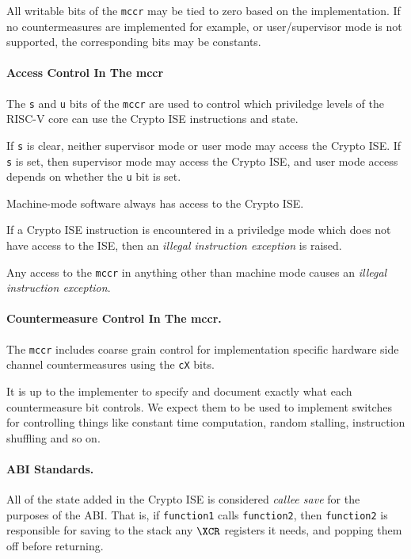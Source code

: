 All writable bits of the {\tt mccr} may be tied to zero based on the
implementation. If no countermeasures are implemented for example, or
user/supervisor mode is not supported, the corresponding bits may be
constants.

\paragraph{Access Control In The mccr}

The {\tt s} and {\tt u} bits of the {\tt mccr} are used to control which
priviledge levels of the RISC-V core can use the Crypto ISE instructions
and state. 

If {\tt s} is clear, neither supervisor mode or user mode may access the
Crypto ISE. If {\tt s} is set, then supervisor mode may access the Crypto
ISE, and user mode access depends on whether the {\tt u} bit is set.

Machine-mode software always has access to the Crypto ISE.

If a Crypto ISE instruction is encountered in a priviledge mode which
does not have access to the ISE, then an {\em illegal instruction exception}
is raised.

Any access to the {\tt mccr} in anything other than machine mode
causes an {\em illegal instruction exception}.

\paragraph{Countermeasure Control In The mccr.}

The {\tt mccr} includes coarse grain control for implementation specific
hardware side channel countermeasures using the {\tt cX} bits.

It is up to the implementer to specify and document exactly what each
countermeasure bit controls. We expect them to be used to implement
switches for controlling things like constant time computation, random
stalling, instruction shuffling and so on.

\paragraph{ABI Standards.}

All of the state added in the Crypto ISE is considered {\em callee save}
for the purposes of the ABI.
That is, if {\tt function1} calls 
{\tt function2}, then {\tt function2} is responsible for saving to the
stack any $\XCR$ registers it needs, and popping them off before returning.

